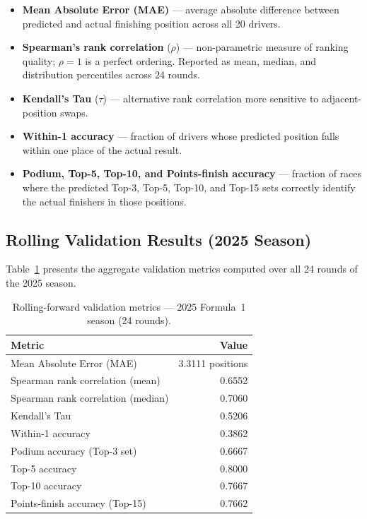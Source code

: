 \documentclass[12pt, a4paper, oneside]{report}
\begin{document}
\begin{itemize}[leftmargin=*]
  \item \textbf{Mean Absolute Error (MAE)} --- average absolute difference
        between predicted and actual finishing position across all 20 drivers.
  \item \textbf{Spearman's rank correlation} ($\rho$) --- non-parametric
        measure of ranking quality; $\rho = 1$ is a perfect ordering.
        Reported as mean, median, and distribution percentiles across 24 rounds.
  \item \textbf{Kendall's Tau} ($\tau$) --- alternative rank correlation more
        sensitive to adjacent-position swaps.
  \item \textbf{Within-1 accuracy} --- fraction of drivers whose predicted
        position falls within one place of the actual result.
  \item \textbf{Podium, Top-5, Top-10, and Points-finish accuracy} --- fraction
        of races where the predicted Top-3, Top-5, Top-10, and Top-15 sets
        correctly identify the actual finishers in those positions.
\end{itemize}

\subsection{Rolling Validation Results (2025 Season)}
\label{subsec:rolling-results}

Table~\ref{tab:results} presents the aggregate validation metrics computed over
all 24 rounds of the 2025 season.

\begin{table}[H]
\centering
\caption{Rolling-forward validation metrics --- 2025 Formula~1 season (24 rounds).}
\label{tab:results}
\begin{tabular}{@{} l r @{}}
  \toprule
  \textbf{Metric} & \textbf{Value} \\
  \midrule
  Mean Absolute Error (MAE)          & 3.3111 positions \\
  Spearman rank correlation (mean)   & 0.6552 \\
  Spearman rank correlation (median) & 0.7060 \\
  Kendall's Tau                      & 0.5206 \\
  Within-1 accuracy                  & 0.3862 \\
  Podium accuracy (Top-3 set)        & 0.6667 \\
  Top-5 accuracy                     & 0.8000 \\
  Top-10 accuracy                    & 0.7667 \\
  Points-finish accuracy (Top-15)    & 0.7662 \\
  \bottomrule
\end{tabular}
\end{table}
\end{document}
